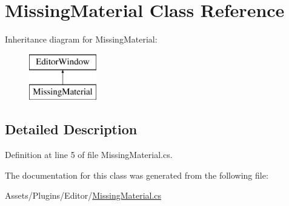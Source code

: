 \hypertarget{class_missing_material}{}\section{Missing\+Material Class Reference}
\label{class_missing_material}
Inheritance diagram for Missing\+Material\+:\begin{figure}[H]
\begin{center}
\leavevmode
\includegraphics[height=2.000000cm]{class_missing_material}
\end{center}
\end{figure}


\subsection{Detailed Description}


Definition at line 5 of file Missing\+Material.\+cs.



The documentation for this class was generated from the following file\+:\begin{DoxyCompactItemize}
\item 
Assets/\+Plugins/\+Editor/\mbox{\hyperlink{_missing_material_8cs}{Missing\+Material.\+cs}}\end{DoxyCompactItemize}
